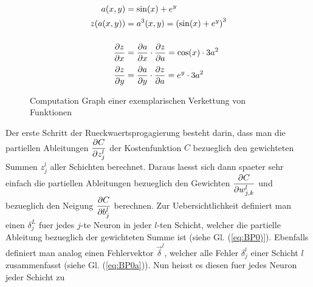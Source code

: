\begin{figure}[h!]
  \begin{minipage}[h!]{0.5\textwidth}
    \centering

  \end{minipage}
  \begin{minipage}[h!]{0.5\textwidth}
    \begin{align*} %
      a(x,y) &= \sin(x) + e^y \\
      z(a(x,y)) &= a^3(x,y) = \left(\sin(x) + e^y\right)^3 \\[3ex]
      \partderiv{z}{x} &= \partderiv{a}{x} \cdot  \partderiv{z}{a} = \cos(x) \cdot 3a^2 \\[0.5ex]
      \partderiv{z}{y} &= \partderiv{a}{y} \cdot \partderiv{z}{a} = e^y \cdot 3a^2
    \end{align*}
  \end{minipage}

  \caption{Computation Graph einer exemplarischen Verkettung von Funktionen}
  \label{fig:computation_graph}
\end{figure}
\para{}
Der erste Schritt der Rueckwaertsprogagierung besteht darin, dass man die partiellen Ableitungen $\displaystyle\frac{\partial C}{\partial z_j^l}$
der Kostenfunktion $C$ bezueglich den gewichteten Summen $z_j^l$ aller Schichten
berechnet. Daraus laesst sich dann spaeter sehr einfach die partiellen Ableitungen
bezueglich den Gewichten $\displaystyle\frac{\partial C}{\partial w_{j,k}^l}$ und bezueglich den Neigung
$\displaystyle\frac{\partial C}{\partial b_j^l}$ berechnen.
\para{}
Zur Uebersichtlichkeit definiert man einen  $\delta_j^L$ fuer
jedes $j$-te Neuron in jeder $l$-ten Schicht, welcher die partielle Ableitung bezueglich der
gewichteten Summe ist (siehe Gl. (\ref{eq:BP0)}). Ebenfalls definiert man analog einen Fehlervektor
$\vec{\delta}^l$, welcher alle Fehler $\delta_j^l$ einer Schicht $l$
zusammenfasst (siehe Gl. (\ref{eq:BP0a})). Nun heisst es diesen fuer jedes Neuron jeder Schicht zu
